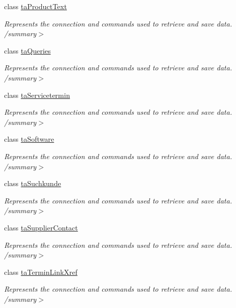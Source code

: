 \begin{DoxyCompactItemize}
class \hyperlink{class_products_1_1_data_1_1ds_sage_table_adapters_1_1ta_product_text}{ta\+Product\+Text}
\begin{DoxyCompactList}\small\item\em Represents the connection and commands used to retrieve and save data. /summary$>$ \end{DoxyCompactList}\item 
class \hyperlink{class_products_1_1_data_1_1ds_sage_table_adapters_1_1ta_queries}{ta\+Queries}
\begin{DoxyCompactList}\small\item\em Represents the connection and commands used to retrieve and save data. /summary$>$ \end{DoxyCompactList}\item 
class \hyperlink{class_products_1_1_data_1_1ds_sage_table_adapters_1_1ta_servicetermin}{ta\+Servicetermin}
\begin{DoxyCompactList}\small\item\em Represents the connection and commands used to retrieve and save data. /summary$>$ \end{DoxyCompactList}\item 
class \hyperlink{class_products_1_1_data_1_1ds_sage_table_adapters_1_1ta_software}{ta\+Software}
\begin{DoxyCompactList}\small\item\em Represents the connection and commands used to retrieve and save data. /summary$>$ \end{DoxyCompactList}\item 
class \hyperlink{class_products_1_1_data_1_1ds_sage_table_adapters_1_1ta_suchkunde}{ta\+Suchkunde}
\begin{DoxyCompactList}\small\item\em Represents the connection and commands used to retrieve and save data. /summary$>$ \end{DoxyCompactList}\item 
class \hyperlink{class_products_1_1_data_1_1ds_sage_table_adapters_1_1ta_supplier_contact}{ta\+Supplier\+Contact}
\begin{DoxyCompactList}\small\item\em Represents the connection and commands used to retrieve and save data. /summary$>$ \end{DoxyCompactList}\item 
class \hyperlink{class_products_1_1_data_1_1ds_sage_table_adapters_1_1ta_termin_link_xref}{ta\+Termin\+Link\+Xref}
\begin{DoxyCompactList}\small\item\em Represents the connection and commands used to retrieve and save data. /summary$>$ \end{DoxyCompactList}\item 

\end{DoxyCompactItemize}
